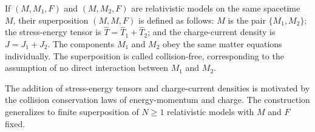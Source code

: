 If $(M, M_1, F)$ and $(M, M_2, F)$ are relativistic models on the same spacetime $M$, their superposition $(M, M, F)$ is defined as follows: $M$ is the pair $\{M_1, M_2\}$; the stress-energy tensor is $\hat{T} = \hat{T}_1 + \hat{T}_2$; and the charge-current density is $J = J_1 + J_2$. The components $M_1$ and $M_2$ obey the same matter equations individually. The superposition is called collision-free, corresponding to the assumption of no direct interaction between $M_1$ and $M_2$.

The addition of stress-energy tensors and charge-current densities is motivated by the collision conservation laws of energy-momentum and charge. The construction generalizes to finite superposition of $N \geq 1$ relativistic models with $M$ and $F$ fixed.
